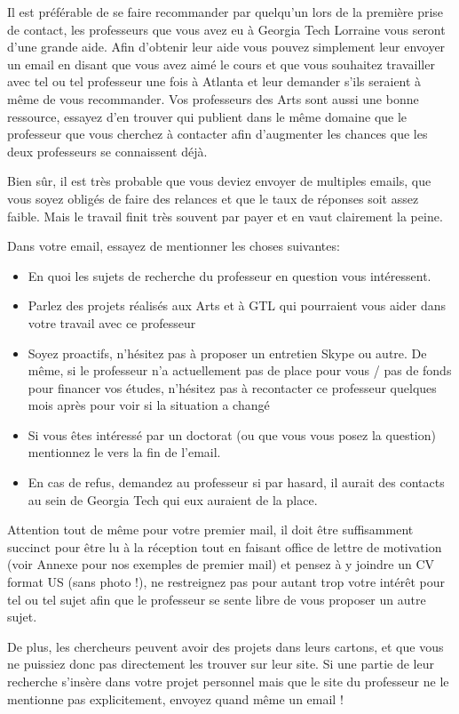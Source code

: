 \documentclass{article}
\begin{document}
Il est préférable de se faire recommander par quelqu'un lors de la première prise de contact, les professeurs que vous avez eu à Georgia Tech Lorraine vous seront d'une grande aide. Afin d'obtenir leur aide vous pouvez simplement leur envoyer un email en disant que vous avez aimé le cours et que vous souhaitez travailler avec tel ou tel professeur une fois à Atlanta et leur demander s'ils seraient à même de vous recommander. Vos professeurs des Arts sont aussi une bonne ressource, essayez d'en trouver qui publient dans le même domaine que le professeur que vous cherchez à contacter afin d'augmenter les chances que les deux professeurs se connaissent déjà. 

Bien sûr, il est très probable que vous deviez envoyer de multiples emails, que vous soyez obligés de faire des relances et que le taux de réponses soit assez faible. Mais le travail finit très souvent par payer et en vaut clairement la peine. 

Dans votre email, essayez de mentionner les choses suivantes:

\begin{itemize}
\item En quoi les sujets de recherche du professeur en question vous intéressent. 
\item Parlez des projets réalisés aux Arts et à GTL qui pourraient vous aider dans votre travail avec ce professeur
\item Soyez proactifs, n'hésitez pas à proposer un entretien Skype ou autre. De même, si le professeur n'a actuellement pas de place pour vous / pas de fonds pour financer vos études, n'hésitez pas à recontacter ce professeur quelques mois après pour voir si la situation a changé
\item Si vous êtes intéressé par un doctorat (ou que vous vous posez la question) mentionnez le vers la fin de l'email.
\item En cas de refus, demandez au professeur si par hasard, il aurait des contacts au sein de Georgia Tech qui eux auraient de la place.
\end{itemize}
Attention tout de même pour votre premier mail, il doit être suffisamment succinct pour être lu à la réception tout en faisant office de lettre de motivation (voir Annexe pour nos exemples de premier mail) et pensez à y joindre un CV format US (sans photo !), ne restreignez pas pour autant trop votre intérêt pour tel ou tel sujet afin que le professeur se sente libre de vous proposer un autre sujet. 

De plus, les chercheurs peuvent avoir des projets dans leurs cartons, et que vous ne puissiez donc pas directement les trouver sur leur site. Si une partie de leur recherche s'insère dans votre projet personnel mais que le site du professeur ne le mentionne pas explicitement, envoyez quand même un email ! 
\end{document}
